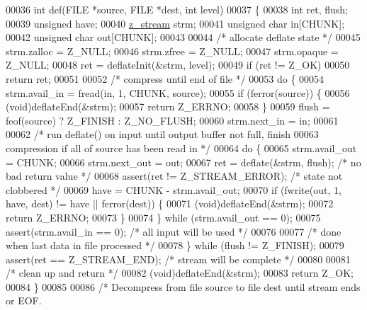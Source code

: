 \begin{DoxyCode}
00036 \textcolor{keywordtype}{int} def(FILE *source, FILE *dest, \textcolor{keywordtype}{int} level)
00037 \{
00038     \textcolor{keywordtype}{int} ret, flush;
00039     \textcolor{keywordtype}{unsigned} have;
00040     \hyperlink{structz__stream__s}{z\_stream} strm;
00041     \textcolor{keywordtype}{unsigned} \textcolor{keywordtype}{char} in[CHUNK];
00042     \textcolor{keywordtype}{unsigned} \textcolor{keywordtype}{char} out[CHUNK];
00043 
00044     \textcolor{comment}{/* allocate deflate state */}
00045     strm.zalloc = Z\_NULL;
00046     strm.zfree = Z\_NULL;
00047     strm.opaque = Z\_NULL;
00048     ret = deflateInit(&strm, level);
00049     \textcolor{keywordflow}{if} (ret != Z\_OK)
00050         \textcolor{keywordflow}{return} ret;
00051 
00052     \textcolor{comment}{/* compress until end of file */}
00053     \textcolor{keywordflow}{do} \{
00054         strm.avail\_in = fread(in, 1, CHUNK, source);
00055         \textcolor{keywordflow}{if} (ferror(source)) \{
00056             (void)deflateEnd(&strm);
00057             \textcolor{keywordflow}{return} Z\_ERRNO;
00058         \}
00059         flush = feof(source) ? Z\_FINISH : Z\_NO\_FLUSH;
00060         strm.next\_in = in;
00061 
00062         \textcolor{comment}{/* run deflate() on input until output buffer not full, finish}
00063 \textcolor{comment}{           compression if all of source has been read in */}
00064         \textcolor{keywordflow}{do} \{
00065             strm.avail\_out = CHUNK;
00066             strm.next\_out = out;
00067             ret = deflate(&strm, flush);    \textcolor{comment}{/* no bad return value */}
00068             assert(ret != Z\_STREAM\_ERROR);  \textcolor{comment}{/* state not clobbered */}
00069             have = CHUNK - strm.avail\_out;
00070             \textcolor{keywordflow}{if} (fwrite(out, 1, have, dest) != have || ferror(dest)) \{
00071                 (void)deflateEnd(&strm);
00072                 \textcolor{keywordflow}{return} Z\_ERRNO;
00073             \}
00074         \} \textcolor{keywordflow}{while} (strm.avail\_out == 0);
00075         assert(strm.avail\_in == 0);     \textcolor{comment}{/* all input will be used */}
00076 
00077         \textcolor{comment}{/* done when last data in file processed */}
00078     \} \textcolor{keywordflow}{while} (flush != Z\_FINISH);
00079     assert(ret == Z\_STREAM\_END);        \textcolor{comment}{/* stream will be complete */}
00080 
00081     \textcolor{comment}{/* clean up and return */}
00082     (void)deflateEnd(&strm);
00083     \textcolor{keywordflow}{return} Z\_OK;
00084 \}
00085 
00086 \textcolor{comment}{/* Decompress from file source to file dest until stream ends or EOF.}

\end{DoxyCode}
